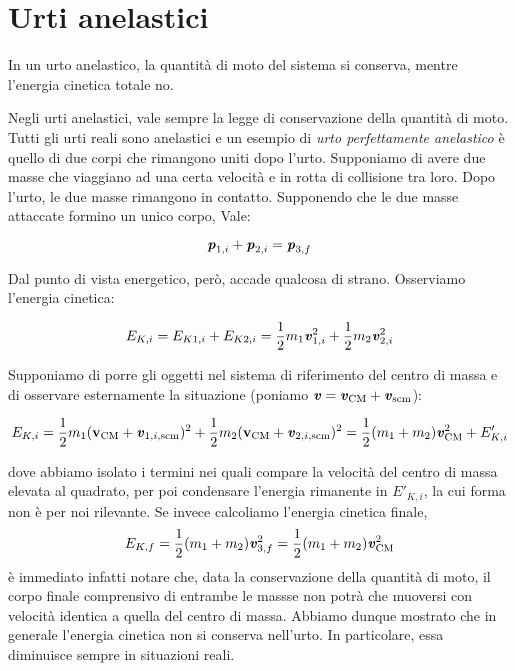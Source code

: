 \section{Urti anelastici}
\begin{tcolorbox}[colback = yellow!30, colframe = yellow!30!black, title = {Urto}]
    In un urto anelastico, la quantità di moto del sistema si conserva, mentre
    l'energia cinetica totale no.
\end{tcolorbox}
\vspace{5pt}

\noindent Negli urti anelastici, vale sempre la legge di conservazione della quantità
di moto. Tutti gli urti reali sono anelastici e un esempio di \textit{urto perfettamente
anelastico} è quello di due corpi che rimangono uniti dopo l'urto. Supponiamo di avere due masse che viaggiano ad una certa velocità
e in rotta di collisione tra loro. Dopo l'urto, le due masse rimangono
in contatto. Supponendo che le due masse attaccate formino un unico corpo, Vale:

\[ \textbf{\textit{p}}_{1,i} + \textbf{\textit{p}}_{2,i} = \textbf{\textit{p}}_{3,f} \]

\noindent Dal punto di vista energetico, però, accade qualcosa di strano. Osserviamo
l'energia cinetica:

\[ E_{K,i} = E_{K1, i} + E_{K2, i} = \frac12 m_1\textbf{\textit{v}}_{1,i}^2 + \frac12 m_2\textbf{\textit{v}}_{2,i}^2\]

\noindent Supponiamo di porre gli oggetti nel sistema di riferimento del centro di massa
e di osservare esternamente la situazione (poniamo $\textbf{\textit{v}} = \textbf{\textit{v}}_\text{CM} + \textbf{\textit{v}}_\text{scm}$):

\[ E_{K,i} = \frac12 m_1(\textbf{v}_\text{CM} + \textbf{\textit{v}}_{1,i,\text{scm}})^2 + \frac12 m_2(\textbf{v}_\text{CM} + \textbf{\textit{v}}_{2,i,\text{scm}})^2 = \frac12(m_1 + m_2)\textbf{\textit{v}}_\text{CM}^2 + E'_{K,i} \]

\noindent dove abbiamo isolato i termini nei quali compare la velocità del centro di massa
elevata al quadrato, per poi condensare l'energia rimanente in $E'_{K,i}$,
la cui forma non è per noi rilevante. Se invece calcoliamo l'energia cinetica
finale,
\[ E_{K,f} = \frac12 (m_1 + m_2)\textbf{\textit{v}}_{3,f}^2 = \frac12(m_1 + m_2)\textbf{\textit{v}}_\text{CM}^2 \]
è immediato infatti notare che, data la conservazione della quantità di moto,
il corpo finale comprensivo di entrambe le massse non potrà che muoversi
con velocità identica a quella del centro di massa.
Abbiamo dunque mostrato che in generale l'energia cinetica non si conserva nell'urto.
In particolare, essa diminuisce sempre in situazioni reali.


